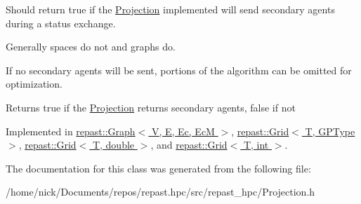 Should return true if the \hyperlink{classrepast_1_1_projection}{Projection} implemented will send secondary agents during a status exchange. 

Generally spaces do not and graphs do.

If no secondary agents will be sent, portions of the algorithm can be omitted for optimization.

\begin{DoxyReturn}{Returns}
true if the \hyperlink{classrepast_1_1_projection}{Projection} returns secondary agents, false if not 
\end{DoxyReturn}


Implemented in \hyperlink{classrepast_1_1_graph_a80cd467aae6d5e2c381bbe9cade6cbba}{repast\-::\-Graph$<$ V, E, Ec, Ec\-M $>$}, \hyperlink{classrepast_1_1_grid_ae3b7e2de573a9212a58a527a9ab519b8}{repast\-::\-Grid$<$ T, G\-P\-Type $>$}, \hyperlink{classrepast_1_1_grid_ae3b7e2de573a9212a58a527a9ab519b8}{repast\-::\-Grid$<$ T, double $>$}, and \hyperlink{classrepast_1_1_grid_ae3b7e2de573a9212a58a527a9ab519b8}{repast\-::\-Grid$<$ T, int $>$}.



The documentation for this class was generated from the following file\-:\begin{DoxyCompactItemize}
\item 
/home/nick/\-Documents/repos/repast.\-hpc/src/repast\-\_\-hpc/Projection.\-h\end{DoxyCompactItemize}
